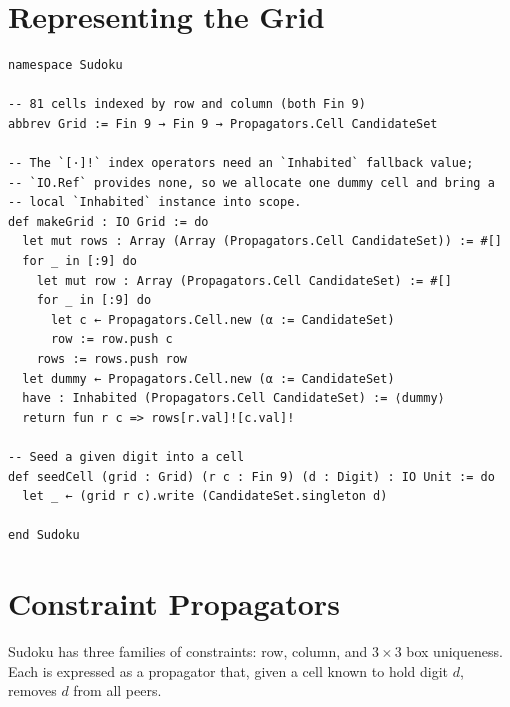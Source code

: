 \documentclass[12pt, a4paper, openright]{book}
\theoremstyle{thmstyle}
\theoremstyle{defstyle}
\begin{document}
\section{Representing the Grid}

\begin{verbatim}
namespace Sudoku

-- 81 cells indexed by row and column (both Fin 9)
abbrev Grid := Fin 9 → Fin 9 → Propagators.Cell CandidateSet

-- The `[·]!` index operators need an `Inhabited` fallback value;
-- `IO.Ref` provides none, so we allocate one dummy cell and bring a
-- local `Inhabited` instance into scope.
def makeGrid : IO Grid := do
  let mut rows : Array (Array (Propagators.Cell CandidateSet)) := #[]
  for _ in [:9] do
    let mut row : Array (Propagators.Cell CandidateSet) := #[]
    for _ in [:9] do
      let c ← Propagators.Cell.new (α := CandidateSet)
      row := row.push c
    rows := rows.push row
  let dummy ← Propagators.Cell.new (α := CandidateSet)
  have : Inhabited (Propagators.Cell CandidateSet) := ⟨dummy⟩
  return fun r c => rows[r.val]![c.val]!

-- Seed a given digit into a cell
def seedCell (grid : Grid) (r c : Fin 9) (d : Digit) : IO Unit := do
  let _ ← (grid r c).write (CandidateSet.singleton d)

end Sudoku
\end{verbatim}

\section{Constraint Propagators}

Sudoku has three families of constraints: row, column, and $3\times 3$ box
uniqueness. Each is expressed as a propagator that, given a cell known to hold
digit $d$, removes $d$ from all peers.
\end{document}
